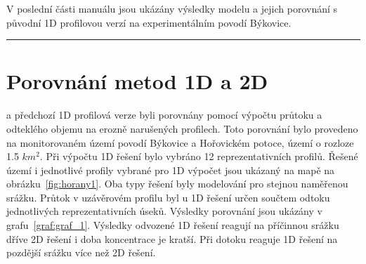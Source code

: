 %




V poslední části manuálu jsou ukázány výsledky modelu \smod a jejich porovnání s původní 1D profilovou verzí na experimentálním povodí Býkovice. \\
\rule{\textwidth}{0.3pt}



\section{Porovnání metod 1D a 2D} \label{porovnani1D2D}


\smod a předchozí 1D profilová verze byli porovnány pomocí výpočtu průtoku a odteklého objemu na erozně narušených profilech. Toto porovnání bylo provedeno na monitorovaném území povodí Býkovice a Hořovickém potoce, území o rozloze 1.5 $km^{2}$. Při výpočtu 1D řešení bylo vybráno 12 reprezentativních profilů. Řešené území i jednotlivé profily vybrané pro 1D výpočet jsou ukázaný na mapě na obrázku~\ref{fig:horany1}. Oba typy řešení byly modelování pro stejnou naměřenou srážku. Průtok v uzávěrovém profilu byl u 1D řešení určen součtem odtoku jednotlivých reprezentativních úseků. Výsledky porovnání jsou ukázány v grafu~\ref{graf:graf_1}. Výsledky odvozené 1D řešení reagují na příčinnou srážku dříve 2D řešení i doba koncentrace je kratší. Při dotoku reaguje 1D řešení na pozdější srážku více než 2D řešení. 



